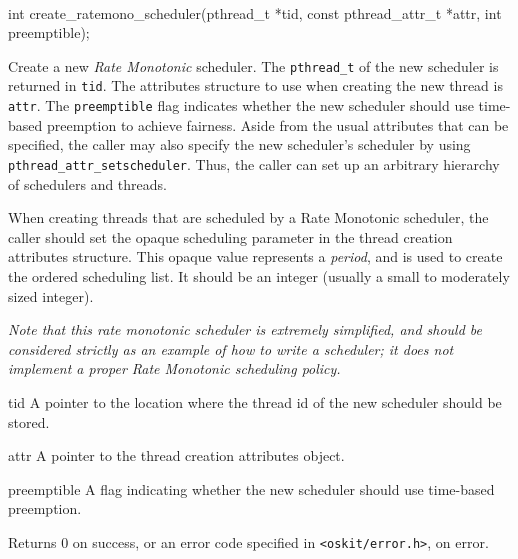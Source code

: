 \begin{apisyn}
	\\

	\funcproto int create_ratemono_scheduler(pthread_t *tid,
			const pthread_attr_t *attr, int preemptible);
\end{apisyn}
\begin{apidesc}
	Create a new \emph{Rate Monotonic} scheduler. The \texttt{pthread_t}
	of the new scheduler is returned in \texttt{tid}. The attributes
	structure to use when creating the new thread is \texttt{attr}. The
	\texttt{preemptible} flag indicates whether the new scheduler
	should use time-based preemption to achieve fairness.  Aside from
	the usual attributes that can be specified, the caller may also
	specify the new scheduler's scheduler by using
	\texttt{pthread_attr_setscheduler}. Thus, the caller can set up an
	arbitrary hierarchy of schedulers and threads.

	When creating threads that are scheduled by a Rate Monotonic
	scheduler, the caller should set the opaque scheduling parameter in
	the thread creation attributes structure. This opaque value
	represents a \emph{period}, and is used to create the ordered
	scheduling list. It should be an integer (usually a small to
	moderately sized integer).

	\emph{Note that this rate monotonic scheduler is extremely
	simplified, and should be considered strictly as an example of how
	to write a scheduler; it does not implement a proper Rate Monotonic
	scheduling policy.}
\end{apidesc}
\begin{apiparm}
	\item[tid]
		A pointer to the location where the thread id of the new
		scheduler should be stored. 
	\item[attr]
		A pointer to the thread creation attributes object.
	\item[preemptible]
		A flag indicating whether the new scheduler should use
		time-based preemption.
\end{apiparm}
\begin{apiret}
	Returns 0 on success, or an error code specified in
	{\tt <oskit/error.h>}, on error.
\end{apiret}



